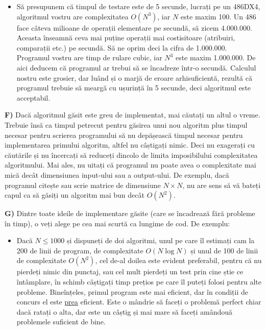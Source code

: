 \begin{itemize}

\item Să presupunem că timpul de testare este de 5 secunde, lucrați pe un
  486DX4, algoritmul vostru are complexitatea $O(N^3)$, iar $N$ este maxim
  100. Un 486 face câteva milioane de operații elementare pe secundă, să zicem
  4.000.000. Aceasta înseamnă ceva mai puține operații mai costisitoare
  (atribuiri, comparații etc.) pe secundă. Să ne oprim deci la cifra de
  1.000.000. Programul vostru are timp de rulare cubic, iar $N^3$ este maxim
  1.000.000. De aici deducem că programul ar trebui să se încadreze într-o
  secundă. Calculul nostru este grosier, dar luând și o marjă de eroare
  arhisuficientă, rezultă că programul trebuie să meargă cu ușurință în 5
  secunde, deci algoritmul este acceptabil.

\end{itemize}

{\bf F)} Dacă algoritmul găsit este greu de implementat, mai căutați un altul
o vreme. Trebuie însă ca timpul petrecut pentru găsirea unui nou algoritm plus
timpul necesar pentru scrierea programului să nu depășească timpul necesar
pentru implementarea primului algoritm, altfel nu câștigați nimic. Deci nu
exagerați cu căutările și nu încercați să reduceți dincolo de limita
imposibilului complexitatea algoritmului. Mai ales, nu uitați că programul nu
poate avea o complexitate mai mică decât dimensiunea input-ului sau a
output-ului. De exemplu, dacă programul citește sau scrie matrice de
dimensiune $N \times N$, nu are sens să vă bateți capul ca să găsiți un
algoritm mai bun decât $O(N^2)$.

{\bf G)} Dintre toate ideile de implementare găsite (care se încadrează fără
probleme în timp), o veți alege pe cea mai scurtă ca lungime de cod. De
exemplu:

\begin{itemize}

\item Dacă $N \leq 1000$ și dispuneți de doi algoritmi, unul pe care îl
  estimați cam la 200 de linii de program, de complexitate $O(N \log N)$ și
  unul de 100 de linii de complexitate $O(N^2)$, cel de-al doilea este evident
  preferabil, pentru că nu pierdeți nimic din punctaj, sau cel mult pierdeți
  un test prin cine știe ce întâmplare, în schimb câștigați timp prețios pe
  care îl puteți folosi pentru alte probleme. Bineînțeles, primul program este
  mai eficient, dar în condiții de concurs el este \underline{prea}
  eficient. Este o mândrie să faceți o problemă perfect chiar dacă ratați o
  alta, dar este un câștig și mai mare să faceți amândouă problemele suficient
  de bine.

\end{itemize}

